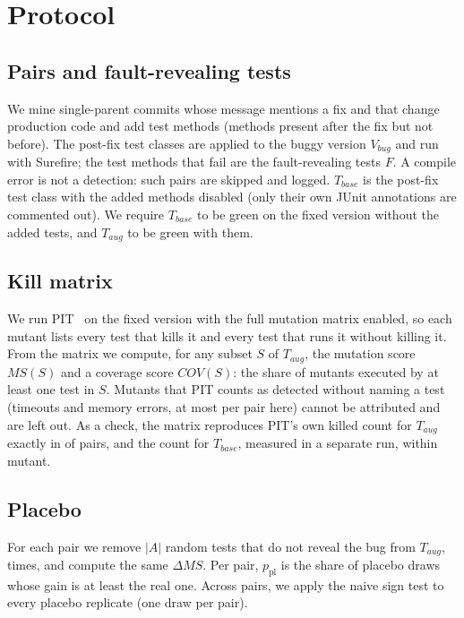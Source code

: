 \documentclass[conference]{IEEEtran}
\newcommand{\MS}{\mathit{MS}}
\newcommand{\COV}{\mathit{COV}}
\newcommand{\Tbase}{T_{\mathit{base}}}
\newcommand{\Taug}{T_{\mathit{aug}}}
\begin{document}
\section{Protocol}\label{sec:protocol}
\subsection{Pairs and fault-revealing tests}
We mine single-parent commits whose message mentions a fix and that change production code and add test
methods (methods present after the fix but not before). The post-fix test classes are applied to the buggy
version $V_{\mathit{bug}}$ and run with Surefire; the test methods that fail are the fault-revealing tests $F$.
A compile error is not a detection: such pairs are skipped and logged. $\Tbase$ is the post-fix test class
with the added methods disabled (only their own JUnit annotations are commented out). We require $\Tbase$ to
be green on the fixed version without the added tests, and $\Taug$ to be green with them.

\subsection{Kill matrix}
We run PIT~\cite{coles2016pit} on the fixed version with the full mutation matrix enabled, so each mutant
lists every test that kills it and every test that runs it without killing it. From the matrix we compute,
for any subset $S$ of $\Taug$, the mutation score $\MS(S)$ and a coverage score $\COV(S)$: the share of mutants
executed by at least one test in $S$. Mutants that PIT counts as detected without naming a test (timeouts and
memory errors, at most \LeftOutMax{} per pair here) cannot be attributed and are left out. As a check, the
matrix reproduces PIT's own killed count for $\Taug$ exactly in \MatrixExactPairs{} of \RqOnePairs{} pairs,
and the count for $\Tbase$, measured in a separate run, within \MatrixMaxBaseDiff{} mutant.

\subsection{Placebo}\label{sec:placebo}
For each pair we remove $|A|$ random tests that do not reveal the bug from $\Taug$, \PlaceboDraws{} times, and
compute the same $\Delta\MS$. Per pair, $p_{\mathrm{pl}}$ is the share of placebo draws whose gain is at
least the real one. Across pairs, we apply the naive sign test to every placebo replicate (one draw per pair).
\end{document}
